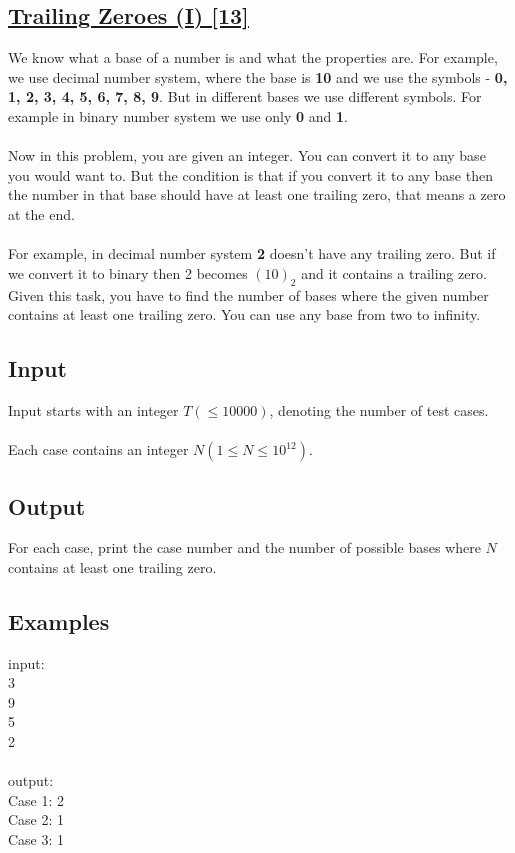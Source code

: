 \documentclass[10pt,a4paper]{article}
\begin{document}
\begin{itemize}
\subsection*{\href{https://lightoj.com/problem/trailing-zeroes-i}{\underline{Trailing Zeroes (I) [13]}}}
We know what a base of a number is and what the properties are. For example, we use decimal number system, where the base is \textbf{10} and we use the symbols - \textbf{{0, 1, 2, 3, 4, 5, 6, 7, 8, 9}}. But in different bases we use different symbols. For example in binary number system we use only \textbf{0} and \textbf{1}.
\\ \\
Now in this problem, you are given an integer. You can convert it to any base you would want to. But the condition is that if you convert it to any base then the number in that base should have at least one trailing zero, that means a zero at the end.
\\ \\
For example, in decimal number system \textbf{2} doesn't have any trailing zero. But if we convert it to binary then 2 becomes $(10)_2$ and it contains a trailing zero. Given this task, you have to find the number of bases where the given number contains at least one trailing zero. You can use any base from two to infinity.

\subsection*{Input}
Input starts with an integer $T (\leq 10000)$, denoting the number of test cases.
\\ \\
Each case contains an integer $N (1 \leq N \leq 10^{12})$.
\subsection*{Output}
For each case, print the case number and the number of possible bases where $N$ contains at least one trailing zero.
\subsection*{Examples}
input: \\
3 \\
9 \\
5 \\
2 \\
\\
output: \\
Case 1: 2 \\
Case 2: 1 \\
Case 3: 1 

\end{itemize}
\end{document}
